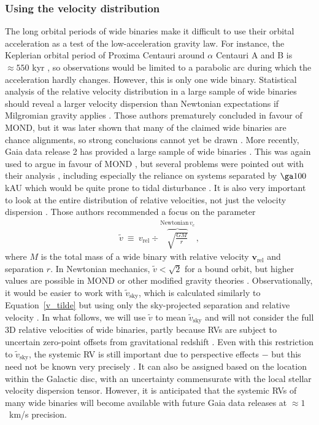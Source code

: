 \documentclass[fleqn,usenatbib,useAMS,onecolumn]{mnras} %
\begin{document}
\subsubsection{Using the velocity distribution}
\label{Wide_binaries_using_v}

The long orbital periods of wide binaries make it difficult to use their orbital acceleration as a test of the low-acceleration gravity law. For instance, the Keplerian orbital period of Proxima Centauri around $\alpha$ Centauri A and B is $\approx 550$ kyr \citep{Kervella_2017}, so observations would be limited to a parabolic arc during which the acceleration hardly changes. However, this is only one wide binary. Statistical analysis of the relative velocity distribution in a large sample of wide binaries should reveal a larger velocity dispersion than Newtonian expectations if Milgromian gravity applies \citep{Hernandez_2012}. Those authors prematurely concluded in favour of MOND, but it was later shown that many of the claimed wide binaries are chance alignments, so strong conclusions cannot yet be drawn \citep{Scarpa_2017}. More recently, Gaia data release 2 \citep{Gaia_2018} has provided a large sample of wide binaries \citep[e.g.][]{Andrews_2017}. This was again used to argue in favour of MOND \citep{Hernandez_2018}, but several problems were pointed out with their analysis \citep{Badry_2019, Banik_2019_line}, including especially the reliance on systems separated by $\ga 100$ kAU which would be quite prone to tidal disturbance \citep{Jiang_2010}. It is also very important to look at the entire distribution of relative velocities, not just the velocity dispersion \citep{Pittordis_2018}. Those authors recommended a focus on the parameter
\begin{eqnarray}
	\widetilde{v} ~\equiv~ v_\text{rel} \div \overbrace{\sqrt{\frac{GM}{r}}}^{\text{Newtonian} \,  v_c} \, ,
	\label{v_tilde}
\end{eqnarray}
where $M$ is the total mass of a wide binary with relative velocity $\bm{v}_\text{rel}$ and separation $r$. In Newtonian mechanics, $\widetilde{v} < \sqrt{2}$ for a bound orbit, but higher values are possible in MOND or other modified gravity theories \citep{Pittordis_2018}. Observationally, it would be easier to work with $\widetilde{v}_{\text{sky}}$, which is calculated similarly to Equation~\ref{v_tilde} but using only the sky-projected separation and relative velocity \citep{Banik_2018_Centauri}. In what follows, we will use $\widetilde{v}$ to mean $\widetilde{v}_{\text{sky}}$ and will not consider the full 3D relative velocities of wide binaries, partly because RVs are subject to uncertain zero-point offsets from gravitational redshift \citep{Loeb_2022}. Even with this restriction to $\widetilde{v}_{\text{sky}}$, the systemic RV is still important due to perspective effects \citep{Badry_2019} $-$ but this need not be known very precisely \citep{Banik_2019_line}. It can also be assigned based on the location within the Galactic disc, with an uncertainty commensurate with the local stellar velocity dispersion tensor. However, it is anticipated that the systemic RVs of many wide binaries will become available with future Gaia data releases at $\approx 1$~km/s precision.
\end{document}
